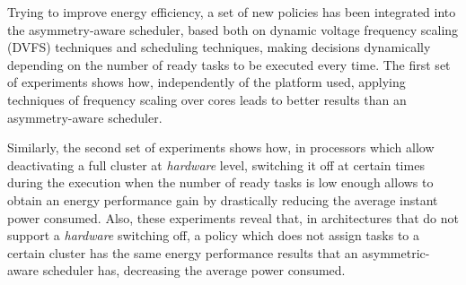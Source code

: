 Trying to improve energy efficiency, a set of new policies has been
integrated into the asymmetry-aware scheduler, based both on dynamic
voltage frequency scaling (DVFS) techniques and scheduling techniques,
making decisions dynamically depending on the number of ready tasks to be
executed every time. The first set of experiments shows how, independently
of the platform used, applying techniques of frequency scaling over \BIG
cores leads to better results than an asymmetry-aware scheduler.



Similarly, the second set of experiments shows how, in processors which
allow deactivating a full cluster at \emph{hardware} level, switching
it off at certain times during the execution when the number of ready tasks
is low enough allows to obtain an energy performance gain by drastically
reducing the average instant power consumed. Also, these experiments reveal
that, in architectures that do not support a \emph{hardware} switching off,
a policy which does not assign tasks to a certain cluster has the same
energy performance results that an asymmetric-aware scheduler has,
decreasing the average power consumed.








